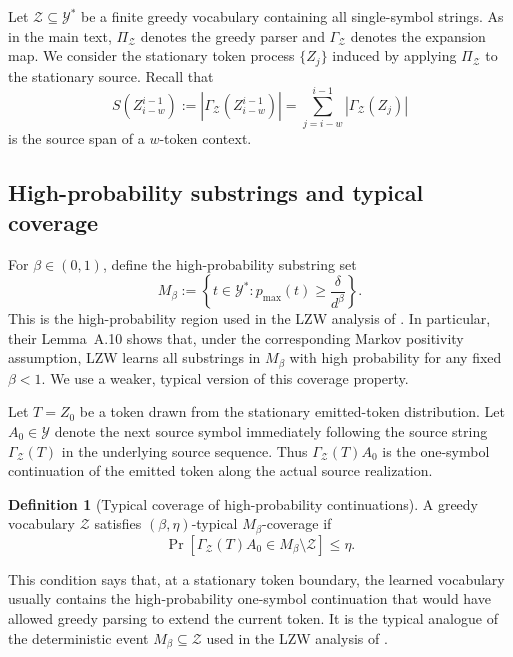 \documentclass{article}
\theoremstyle{plain}
\theoremstyle{definition}
\newtheorem{definition}{Definition}[section]
\theoremstyle{remark}
\begin{document}
    Let $\mathcal Z\subseteq\mathcal Y^*$ be a finite greedy vocabulary containing
    all single-symbol strings. As in the main text, $\Pi_{\mathcal Z}$ denotes the
    greedy parser and $\Gamma_{\mathcal Z}$ denotes the expansion map. We consider
    the stationary token process $\{Z_j\}$ induced by applying
    $\Pi_{\mathcal Z}$ to the stationary source. Recall that
    \[
        S(Z_{i-w}^{i-1})
        :=
        \left|\Gamma_{\mathcal Z}(Z_{i-w}^{i-1})\right|
        =
        \sum_{j=i-w}^{i-1}|\Gamma_{\mathcal Z}(Z_j)|
    \]
    is the source span of a $w$-token context.
    
    \subsection{High-probability substrings and typical coverage}
    
    For $\beta\in(0,1)$, define the high-probability substring set
    \[
        M_\beta
        :=
        \left\{
            t\in\mathcal Y^*:
            p_{\max}(t)\ge \frac{\delta}{d^\beta}
        \right\}.
    \]
    This is the high-probability region used in the LZW analysis of
    \citet{rajaramanAnalysisTokenizationTransformers2024}. In particular, their
    Lemma~A.10 shows that, under the corresponding Markov positivity assumption,
    LZW learns all substrings in $M_\beta$ with high probability for any fixed
    $\beta<1$. We use a weaker, typical version of this coverage property.
    
    Let $T=Z_0$ be a token drawn from the stationary emitted-token distribution.
    Let $A_0\in\mathcal Y$ denote the next source symbol immediately following
    the source string $\Gamma_{\mathcal Z}(T)$ in the underlying source sequence.
    Thus $\Gamma_{\mathcal Z}(T)A_0$ is the one-symbol continuation of the emitted
    token along the actual source realization.
    
    \begin{definition}[Typical coverage of high-probability continuations]
    \label{def:typical-Mbeta-coverage}
    A greedy vocabulary $\mathcal Z$ satisfies $(\beta,\eta)$-typical
    $M_\beta$-coverage if
    \[
        \Pr\!\left[
            \Gamma_{\mathcal Z}(T)A_0
            \in
            M_\beta\setminus \mathcal Z
        \right]
        \le
        \eta .
    \]
    \end{definition}
    
    This condition says that, at a stationary token boundary, the learned vocabulary
    usually contains the high-probability one-symbol continuation that would have
    allowed greedy parsing to extend the current token. It is the typical analogue
    of the deterministic event $M_\beta\subseteq\mathcal Z$ used in the LZW analysis
    of \citet{rajaramanAnalysisTokenizationTransformers2024}.
    
\end{document}
